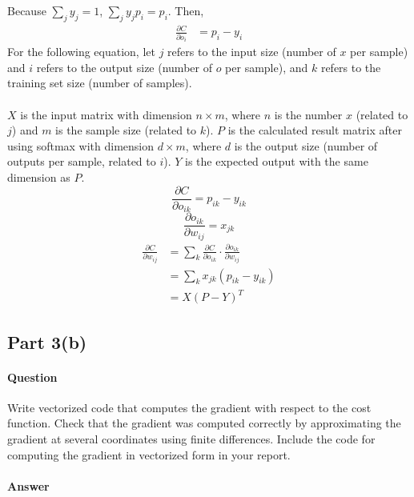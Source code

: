 \documentclass[11pt,twoside]{article}
\begin{document}
Because $\sum_{j}y_j = 1$, $\sum_{j}y_jp_i = p_i$. Then,
\begin{align*}
\frac{\partial C}{\partial o_{i}} &= p_i - y_i
\end{align*}
For the following equation, let $j$ refers to the input size (number of $x$ per sample) and $i$ refers to the output size (number of $o$ per sample), and $k$ refers to the training set size (number of samples).\\
\\
$X$ is the input matrix with dimension $n \times m$, where $n$ is the number $x$ (related to $j$) and $m$ is the sample size (related to $k$). $P$ is the calculated result matrix after using softmax with dimension $d \times m$, where $d$ is the output size (number of outputs per sample, related to $i$). $Y$ is the expected output with the same dimension as $P$.
\[\frac{\partial C}{\partial o_{ik}} = p_{ik} - y_{ik}\]
\[\frac{\partial o_{ik}}{\partial w_{ij}} = x_{jk}\]
\begin{align*}
\frac{\partial C}{\partial w_{ij}} &= \sum_{k}\frac{\partial C}{\partial o_{ik}} \cdot \frac{\partial o_{ik}}{\partial w_{ij}}\\
&= \sum_{k}x_{jk}(p_{ik} - y_{ik})\\
&= X(P - Y)^T
\end{align*}
\subsection*{Part 3(b)}
\paragraph{Question}
Write vectorized code that computes the gradient with respect to the cost function. Check that the gradient was computed correctly by approximating the gradient at several coordinates using finite differences. Include the code for computing the gradient in vectorized form in your report.

\paragraph{Answer}
\end{document}
